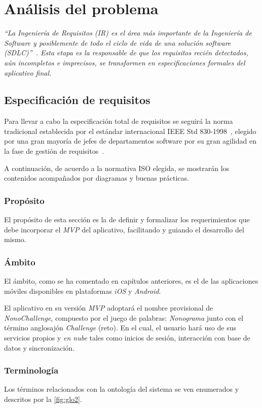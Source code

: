 \chapter{Análisis del problema}
\textit{``La Ingeniería de Requisitos (IR) es el área más importante de la Ingeniería de Software y posiblemente de todo el 
ciclo de vida de una solución software (SDLC)''~\cite{chakraboty2012requirements}. Esta etapa es la responsable de que los 
requisitos recién detectados, aún incompletos e imprecisos, se transformen en especificaciones formales del aplicativo final.}

\section{Especificación de requisitos}
Para llevar a cabo la especificación total de requisitos se seguirá la norma tradicional establecida por el estándar internacional 
IEEE Std 830-1998~\cite{8559686}, elegido por una gran mayoría de jefes de departamentos software por su gran agilidad en la fase de gestión 
de requisitos~\cite{guzman2018impacto}.

A continuación, de acuerdo a la normativa ISO elegida, se mostrarán los contenidos acompañados por diagramas y buenas prácticas.

\subsection{Propósito}
El propósito de esta sección es la de definir y formalizar los requerimientos que debe incorporar el \textit{MVP} del aplicativo, facilitando
y guiando el desarrollo del mismo.

\subsection{Ámbito}
El ámbito, como se ha comentado en capítulos anteriores, es el de las aplicaciones móviles disponibles en plataformas \textit{iOS} y 
\textit{Android}.

El aplicativo en su versión \textit{MVP} adoptará el nombre provisional de \textit{NonoChallenge}, compuesto por el juego de palabras:
 \textit{Nonograma} junto con el término anglosajón \textit{Challenge} (reto).
En el cual, el usuario hará uso de sus servicios propios y \textit{en nube} tales como inicios de sesión, interacción con base de datos y
sincronización.

\subsection{Terminología}
Los términos relacionados con la ontología del sistema se ven enumerados y descritos por la \autoref{fig:glo2}.

